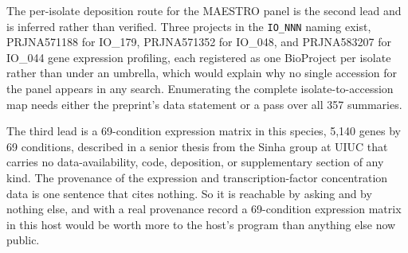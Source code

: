The per-isolate deposition route for the MAESTRO panel is the second lead and is inferred
rather than verified. Three projects in the \texttt{IO\_NNN} naming exist, PRJNA571188 for
IO\_179, PRJNA571352 for IO\_048, and PRJNA583207 for IO\_044 gene expression profiling, each
registered as one BioProject per isolate rather than under an umbrella, which would explain
why no single accession for the panel appears in any search. Enumerating the complete
isolate-to-accession map needs either the preprint's data statement or a pass over all 357
summaries.

The third lead is a 69-condition expression matrix in this species, 5,140 genes by 69
conditions, described in a senior thesis from the Sinha group at UIUC that carries no
data-availability, code, deposition, or supplementary section of any kind. The provenance of
the expression and transcription-factor concentration data is one sentence that cites nothing.
So it is reachable by asking and by nothing else, and with a real provenance record a
69-condition expression matrix in this host would be worth more to the host's program than
anything else now public.
